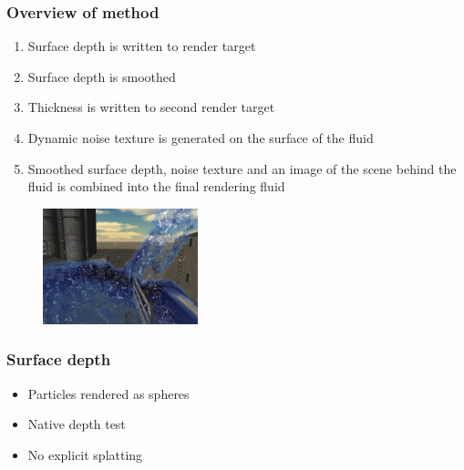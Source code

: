 \documentclass{beamer}
\begin{document}
	\begin{frame}[t]\frametitle{Overview of method}
	    \begin{enumerate}
	    	\item Surface depth is written to render target
	    	\item Surface depth is smoothed
	    	\item Thickness is written to second render target
	    	\item Dynamic noise texture is generated on the surface of the fluid
	    	\item Smoothed surface depth, noise texture and an image of the scene behind the fluid is combined into the final rendering fluid 
	    \end{enumerate}	
	    \begin{figure}
	    	\centering
	    	\includegraphics[width=0.4\textwidth]{waterval.png}
	    \end{figure}
	\end{frame}
	\begin{frame}[t]\frametitle{Surface depth}
		\begin{itemize}
			\item Particles rendered as spheres
			\item Native depth test
			\item No explicit splatting
		\end{itemize}	
	\end{frame}
\end{document}

